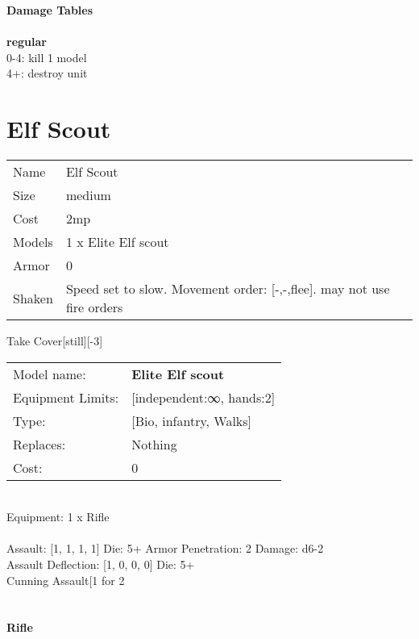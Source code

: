 {\bf Damage Tables} \\
\ \\ {\bf regular } \\
0-4: kill 1 model \\
4+: destroy unit \\










\pagebreak\pagebreak

\section{ Elf Scout }

\begin{tabular}{ll}
  Name & Elf Scout \\
  Size & medium\\
  Cost & 2mp\\
  Models & 1 x Elite Elf scout\\
  Armor & 0\\
  Shaken & Speed set to slow. Movement order: [-,-,flee]. may not use fire orders\\
\end{tabular}

\noindent Take Cover[still][-3]\\ 


\noindent
\begin{tabular}{ll}
Model name: &{\bf Elite Elf scout } \\
Equipment Limits: &[independent:∞, hands:2] \\
Type: &[Bio, infantry, Walks] \\
Replaces: &Nothing \\
Cost: & 0\\
\end{tabular}
\ \\
Equipment: 1 x Rifle \\
\ \\
Assault: [1, 1, 1, 1] Die: 5+ Armor Penetration: 2 Damage: d6-2 \\
Assault Deflection: [1, 0, 0, 0] Die: 5+\\
\indent Cunning Assault[1 for 2\\ 
 
\ \\

\ \\
{\bf Rifle } \\



